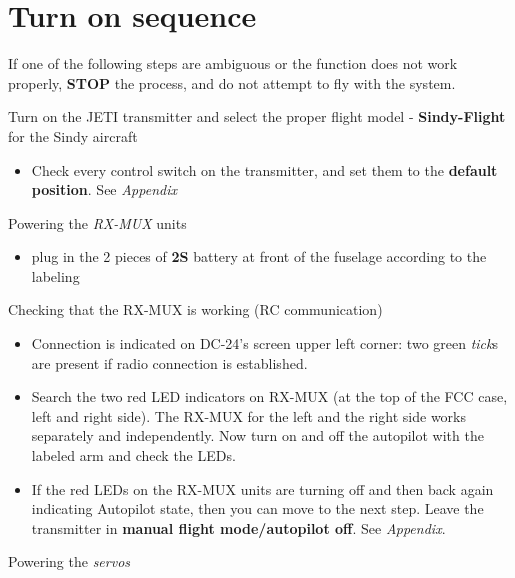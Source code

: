 	\section{Turn on sequence}\label{ii.-turn-on-sequence}
	
	If one of the following steps are ambiguous or the function does not
	work properly, \textbf{STOP} the process, and do not attempt to fly with
	the system.
	
	\begin{todolist}
	\itemsep1pt\parskip0pt
	\item
	  Turn on the JETI transmitter and select the proper flight model -
	  \textbf{Sindy-Flight} for the Sindy aircraft
	
	  \begin{itemize}
	  \itemsep1pt\parskip0pt
	  \item
	    Check every control switch on the transmitter, and set them to the
	    \textbf{default position}. See \emph{Appendix}
	  \end{itemize}
	\item
	  Powering the \emph{RX-MUX} units
	
	  \begin{itemize}
	  \itemsep1pt\parskip0pt
	  \item
	    plug in the 2 pieces of \textbf{2S} battery at front of the fuselage
	    according to the labeling
	  \end{itemize}
	\item
	  Checking that the RX-MUX is working (RC communication)
	
	  \begin{itemize}
	  \itemsep1pt\parskip0pt
	  \item
	    Connection is indicated on DC-24's screen upper left corner: two
	    green \emph{tick}s are present if radio connection is established.
	  \item
	    Search the two red LED indicators on RX-MUX (at the top of the FCC
	    case, left and right side). The RX-MUX for the left and the right
	    side works separately and independently. Now turn on and off the
	    autopilot with the labeled arm and check the LEDs.
	  \item
	    If the red LEDs on the RX-MUX units are turning off and then back
	    again indicating Autopilot state, then you can move to the next
	    step. Leave the transmitter in \textbf{manual flight mode/autopilot
	    off}. See \emph{Appendix}.
	  \end{itemize}
	\item
	  Powering the \emph{servos}
	

\end{todolist}
